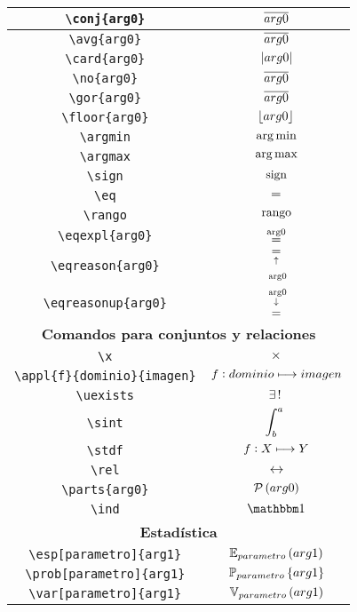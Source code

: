 \begin{longtable}{|c|c|}
\verb|\conj{arg0}| & $\displaystyle\overline{arg0}$ \\ \hline 
\verb|\avg{arg0}| & $\displaystyle\overline{arg0}$ \\ \hline 
\verb|\card{arg0}| & $\displaystyle\left\vert arg0 \right\vert$ \\ \hline 
\verb|\no{arg0}| & $\displaystyle\overline{arg0}$ \\ \hline 
\verb|\gor{arg0}| & $\displaystyle\overline{arg0}$ \\ \hline 
\verb|\floor{arg0}| & $\displaystyle\left\lfloor arg0 \right\rfloor$ \\ \hline 
\verb|\argmin| & $\displaystyle\operatorname*{arg\,min}$ \\ \hline 
\verb|\argmax| & $\displaystyle\operatorname*{arg\,max}$ \\ \hline 
\verb|\sign| & $\displaystyle\operatorname{sign}$ \\ \hline 
\verb|\eq| & $\displaystyle=$ \\ \hline 
\verb|\rango| & $\displaystyle\operatorname{rango}$ \\ \hline 
\verb|\eqexpl{arg0}| & $\displaystyle\eqexpl{arg0}$ \\ \hline 
\verb|\eqreason{arg0}| & $\displaystyle\eqreason{arg0}$ \\ \hline 
\verb|\eqreasonup{arg0}| & $\displaystyle\eqreasonup{arg0}$ \\ \hline 
\multicolumn{2}{|c|}{\textbf{Comandos para conjuntos y relaciones}} \\ \hline 
\verb|\x| & $\displaystyle\times$ \\ \hline 
\verb|\appl{f}{dominio}{imagen}| & $\displaystyle f : dominio\longmapsto imagen$ \\ \hline 
\verb|\uexists| & $\displaystyle\exists\, !\;$ \\ \hline 
\verb|\sint| & $\displaystyle\int_b^a\;$ \\ \hline 
\verb|\stdf| & $\displaystyle f : X\longmapsto Y$ \\ \hline 
\verb|\rel| & $\displaystyle\rel$ \\ \hline 
\verb|\parts{arg0}| & $\displaystyle\mathcal{P}\left(arg0\right)$ \\ \hline 
\verb|\ind| & $\displaystyle\ind$ \\ \hline 
\multicolumn{2}{|c|}{\textbf{Estadística}} \\ \hline 
\verb|\esp[parametro]{arg1}| & $\displaystyle\esp[parametro]{arg1}$ \\ \hline 
\verb|\prob[parametro]{arg1}| & $\displaystyle\prob[parametro]{arg1}$ \\ \hline 
\verb|\var[parametro]{arg1}| & $\displaystyle\var[parametro]{arg1}$ \\ \hline 

\end{longtable}

